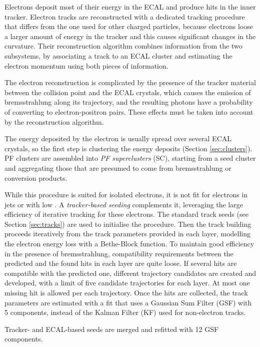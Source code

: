 Electrons deposit most of their energy in the ECAL and produce hits in the inner tracker.
Electron tracks are reconstructed with a dedicated tracking procedure that differs from the one used for other charged particles,
because electrons loose a larger amount of energy in the tracker and this causes significant changes in the curvature.
Their reconstruction algorithm combines information from the two subsystems,
by associating a track to an ECAL cluster and estimating the electron momentum using both pieces of information.

The electron reconstruction is complicated by the presence of the tracker material between the collision point and the ECAL crystals,
which causes the emission of bremsstrahlung along its trajectory, and the resulting photons have a probability of converting to electron-positron pairs.
These effects must be taken into account by the reconstruction algorithm.

The energy deposited by the electron is usually spread over several ECAL crystals, so the first step is clustering the energy deposits (Section \ref{sec:clusters}).
PF clusters are assembled into \textit{PF superclusters} (SC), starting from a seed cluster and aggregating those that are presumed to come from bremsstrahlung or conversion products.

While this procedure is suited for isolated electrons, it is not fit for electrons in jets or with low \pt.
A \textit{tracker-based seeding} complements it, leveraging the large efficiency of iterative tracking for these electrons.
The standard track seeds (see Section \ref{sec:tracks}) are used to initialise the procedure.
Then the track building proceeds iteratively from the track parameters provided in each layer, modelling the electron energy loss with a Bethe-Block function.
To maintain good efficiency in the presence of bremsstrahlung, compatibility requirements between the predicted and the found hits in each layer are quite loose.
If several hits are compatible with the predicted one, different trajectory candidates are created and developed,
with a limit of five candidate trajectories for each layer.
At most one missing hit is allowed per each trajectory.
Once the hits are collected, the track parameters are estimated with a fit that uses a Gaussian Sum Filter (GSF) \cite{CMS-NOTE-2005-001} with 5 components,
instead of the Kalman Filter (KF) \cite{billoir.qian:simultaneous} used for non-electron tracks.

Tracker- and ECAL-based seeds are merged and refitted with 12 GSF components.
